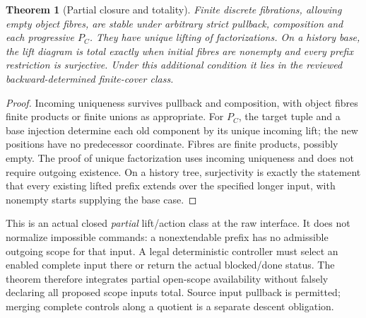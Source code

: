 \documentclass[11pt]{article}
\newtheorem{theorem}{Theorem}\newtheorem{proposition}{Proposition}
\begin{document}
\begin{theorem}[Partial closure and totality]
Finite discrete fibrations, allowing empty object fibres, are stable under arbitrary strict pullback, composition and each progressive $P_C$. They have unique lifting of factorizations. On a history base, the lift diagram is total exactly when initial fibres are nonempty and every prefix restriction is surjective. Under this additional condition it lies in the reviewed backward-determined finite-cover class.
\end{theorem}
\begin{proof}
Incoming uniqueness survives pullback and composition, with object fibres finite products or finite unions as appropriate. For $P_C$, the target tuple and a base injection determine each old component by its unique incoming lift; the new positions have no predecessor coordinate. Fibres are finite products, possibly empty. The proof of unique factorization uses incoming uniqueness and does not require outgoing existence. On a history tree, surjectivity is exactly the statement that every existing lifted prefix extends over the specified longer input, with nonempty starts supplying the base case.\end{proof}

This is an actual closed \emph{partial} lift/action class at the raw interface. It does not normalize impossible commands: a nonextendable prefix has no admissible outgoing scope for that input. A legal deterministic controller must select an enabled complete input there or return the actual blocked/done status. The theorem therefore integrates partial open-scope availability without falsely declaring all proposed scope inputs total. Source input pullback is permitted; merging complete controls along a quotient is a separate descent obligation.
\end{document}

